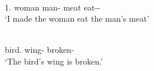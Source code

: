 \begin{exe}\ex\label{WapGen}
\begin{xlist}
\ex\gll{}      \\
1\sg{}.\nom{} \dem{} woman \dem{} man-\gen{} meat eat-\caus{}-\pst{}\\
\glt `I made the woman eat the man's meat' %

\ex\gll\textbf{}  \\
bird.\acc{} wing-\nom{} broken-\stat{}\\
\glt `The bird's wing is broken.'%
\end{xlist}
\end{exe}

%



